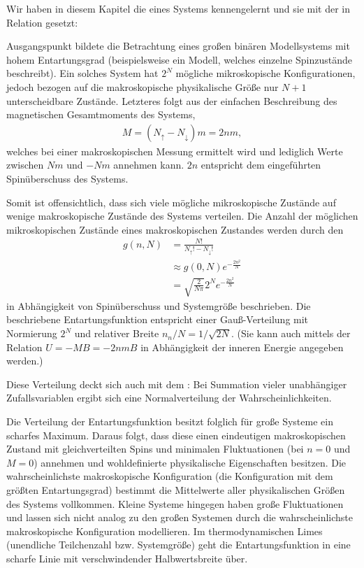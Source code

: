 \begin{summary}
    Wir haben in diesem Kapitel die  eines Systems kennengelernt und sie mit der  in Relation gesetzt:

    Ausgangspunkt bildete die Betrachtung eines großen binären Modellsystems mit hohem Entartungsgrad (beispielsweise ein Modell, welches einzelne Spinzustände beschreibt).
    Ein solches System hat $2^N$ mögliche mikroskopische Konfigurationen, jedoch \textendash{} bezogen auf die makroskopische physikalische Größe \textendash{} nur $N+1$ unterscheidbare Zustände. Letzteres folgt aus der einfachen Beschreibung des magnetischen Gesamtmoments des Systems, 
     \begin{align*}
        M=(N_\uparrow-N_\downarrow)m=2nm,
    \end{align*}
    welches bei einer makroskopischen Messung ermittelt wird und lediglich Werte zwischen $Nm$ und $-Nm$ annehmen kann. $2n$ entspricht dem eingeführten Spinüberschuss des Systems.

    Somit ist offensichtlich, dass sich viele mögliche mikroskopische Zustände auf wenige makroskopische Zustände des Systems verteilen. Die Anzahl der möglichen mikroskopischen Zustände eines makroskopischen Zustandes werden durch den  
    \begin{align*}
        g(n,N)&=\frac{N!}{N_\uparrow!-N_\downarrow!}\\&\approx g(0,N)e^{-\frac{2n^2}{N}}\\&=\sqrt{\frac{2}{N\pi}}2^Ne^{-\frac{2n^2}{N}}
    \end{align*}
    in Abhängigkeit von Spinüberschuss und Systemgröße beschrieben. Die beschriebene Entartungsfunktion entspricht einer Gauß-Verteilung mit Normierung $2^N$ und relativer Breite $n_n/N=1/\sqrt{2N}$. (Sie kann auch mittels der Relation $U=-MB=-2nmB$ in Abhängigkeit der inneren Energie angegeben werden.)

    Diese Verteilung deckt sich auch mit dem : Bei Summation vieler unabhängiger Zufallsvariablen ergibt sich eine Normalverteilung der Wahrscheinlichkeiten.

    Die Verteilung der Entartungsfunktion besitzt folglich für große Systeme ein scharfes Maximum. Daraus folgt, dass diese einen eindeutigen makroskopischen Zustand mit gleichverteilten Spins und minimalen Fluktuationen (bei $n=0$ und $M=0$) annehmen und wohldefinierte physikalische Eigenschaften besitzen. Die wahrscheinlichste makroskopische Konfiguration (die Konfiguration mit dem größten Entartungsgrad) bestimmt die Mittelwerte aller physikalischen Größen des Systems vollkommen. 
    Kleine Systeme hingegen haben große Fluktuationen und lassen sich nicht analog zu den großen Systemen durch die wahrscheinlichste makroskopische Konfiguration modellieren.
    Im thermodynamischen Limes (unendliche Teilchenzahl bzw. Systemgröße) geht die Entartungsfunktion in eine scharfe Linie mit verschwindender Halbwertsbreite über. 
      

\end{summary}
